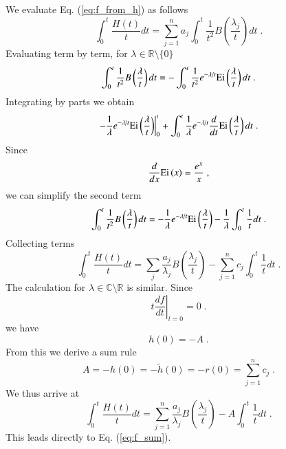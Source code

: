 \documentclass[singlecolumn]{jpsj3}
\begin{document}
We evaluate Eq. (\ref{eq:f_from_h}) as follows
\begin{equation}
\int_0^t {\frac{{H\left( t \right)}}{t}} dt = \sum\limits_{j=1}^{n} {{a_j}\int_0^t {\frac{1}{{{t^2}}}B\left( {\frac{{{\lambda _j}}}{t}} \right)dt} } \;.
\end{equation}
Evaluating term by term, for $\lambda \in \mathbb{R} \setminus \{0\}$
\begin{equation}
  \int_0^t {\frac{1}{{{t^2}}}B\left( {\frac{\lambda }{t}} \right)dt}
  =
   - \int_0^t {\frac{1}{{{t^2}}}{e^{ - {\lambda  \mathord{\left/
 {\vphantom {\lambda  t}} \right.
 \kern-\nulldelimiterspace} t}}}{\rm{Ei}}\left( {\frac{\lambda }{t}} \right)dt} \;.
\end{equation}
Integrating by parts we obtain
\begin{equation}
\left. { - \frac{1}{\lambda }{e^{ - {\lambda  \mathord{\left/
 {\vphantom {\lambda  t}} \right.
 \kern-\nulldelimiterspace} t}}}{\rm{Ei}}\left( {\frac{\lambda }{t}} \right)} \right|_0^t + \int_0^t {\frac{1}{\lambda }{e^{ - {\lambda  \mathord{\left/
 {\vphantom {\lambda  t}} \right.
 \kern-\nulldelimiterspace} t}}}\frac{d}{{dt}}{\rm{Ei}}\left( {\frac{\lambda }{t}} \right)dt} \;.
\end{equation}
Since
\begin{equation}
  \frac{d}{{dx}}{\rm{Ei}}\left( x \right) = \frac{{{e^x}}}{x} \;,
\end{equation}
we can simplify the second term
\begin{equation}
  \int_0^t {\frac{1}{{{t^2}}}B\left( {\frac{\lambda }{t}} \right)dt}
 =
  - \frac{1}{\lambda }{e^{ - {\lambda  \mathord{\left/
 {\vphantom {\lambda  t}} \right.
 \kern-\nulldelimiterspace} t}}}{\rm{Ei}}\left( {\frac{\lambda }{t}} \right) - \frac{1}{\lambda }\int_0^t {\frac{1}{t}dt} \;.
\end{equation}
Collecting terms
\begin{equation}
  \int_0^t {\frac{{H\left( t \right)}}{t}} dt
  =
  \sum\limits_j^{} {\frac{{{a_j}}}{{{\lambda _j}}}B\left( {\frac{{{\lambda _j}}}{t}} \right)}  - \sum\limits_{j = 1}^n {c_j\int_0^t {\frac{1}{t}dt} } \;.
\end{equation}
The calculation for $\lambda \in \mathbb{C} \setminus \mathbb{R}$ is similar.
Since
\begin{equation}
  \left. t\frac{df}{dt} \right|_{t=0} = 0 \;.
\end{equation}
we have
\begin{equation}
  h(0) = -A \;.
\end{equation}
From this we derive a sum rule
\begin{equation}
  A = -h(0) = -\tilde{h}(0) = -r(0)
  =
  \sum\limits_{j=1}^{n} { c_j } \;.
\end{equation}
We thus arrive at
\begin{equation}
  \int_0^t {\frac{{H\left( t \right)}}{t}} dt
  =
  \sum\limits_{j=1}^{n} {\frac{{{a_j}}}{{{\lambda _j}}}B\left( {\frac{{{\lambda _j}}}{t}} \right)}  - A\int_0^t {\frac{1}{t}dt} \;.
\end{equation}
This leads directly to Eq. (\ref{eq:f_sum}).
\end{document}
